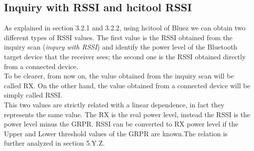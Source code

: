 \subsection{Inquiry with RSSI and hcitool RSSI}
As explained in section 3.2.1 and 3.2.2, using hcitool of Bluez we can obtain two different types of RSSI values.
The first value is the RSSI obtained from the inquiry scan (\textit{inqury with RSSI}) and identify the power level of the Bluetooth target device that the receiver sees; the second one is the RSSI obtained directly from a connected device.\\
To be clearer, from now on, the value obtained from the inquiry scan will be called RX. On the other hand, the value obtained from a connected device will be simply called RSSI.\\
\linebreak
This two values are strictly related with a linear dependence, in fact they represents the same value. The RX is the real power level, instead the RSSI is the power level minus the GRPR. RSSI can be converted to RX power level if the Upper and Lower threshold values of the GRPR are known.The relation is further analyzed in section 5.Y.Z. \\
